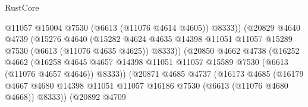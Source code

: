 \begin{lexlean}{RustCore}
\begin{coremodule}
                                        @11057
                                        @15004
                                        @7530
                                        (@6613 (@11076 @4614 @4605))
                                        @8333))
                                    (@20829
                                      @4640
                                      @4739
                                      (@15276
                                        @4640
                                        (@15282
                                          @4624
                                          @4635
                                          @14398
                                          @11051
                                          @11057
                                          @15289
                                          @7530
                                          (@6613 (@11076 @4635 @4625))
                                          @8333))
                                      (@20850
                                        @4662
                                        @4738
                                        (@16252
                                          @4662
                                          (@16258
                                            @4645
                                            @4657
                                            @14398
                                            @11051
                                            @11057
                                            @15589
                                            @7530
                                            (@6613 (@11076 @4657 @4646))
                                            @8333))
                                        (@20871
                                          @4685
                                          @4737
                                          (@16173
                                            @4685
                                            (@16179
                                              @4667
                                              @4680
                                              @14398
                                              @11051
                                              @11057
                                              @16186
                                              @7530
                                              (@6613 (@11076 @4680 @4668))
                                              @8333))
                                          (@20892
                                            @4709

\end{coremodule}
\end{lexlean}
